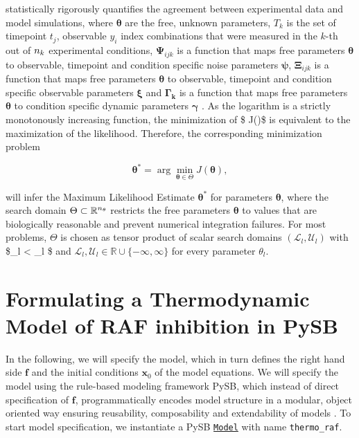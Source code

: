 \documentclass[11pt]{article}
\begin{document}
statistically rigorously quantifies the agreement between experimental
data and model simulations, where \(\boldsymbol{\theta}\) are the free,
unknown parameters, \(T_k\) is the set of timepoint \(t_j\), observable
\(y_i\) index combinations that were measured in the \(k\)-th out of
\({n_{k}}\) experimental conditions, \(\boldsymbol{\Psi}_{ijk}\) is a
function that maps free parameters \(\boldsymbol{\theta}\) to
observable, timepoint and condition specific noise parameters
\(\boldsymbol{\psi}\), \(\boldsymbol{\Xi}_{ijk}\) is a function that
maps free parameters \(\boldsymbol{\theta}\) to observable, timepoint
and condition specific observable parameters \(\boldsymbol{\xi}\) and
\(\boldsymbol{\Gamma_{k}}\) is a function that maps free parameters
\(\boldsymbol{\theta}\) to condition specific dynamic parameters
\(\boldsymbol{\gamma}\) . As the logarithm is a strictly monotonously
increasing function, the minimization of \$ J(\boldsymbol{\theta})\$ is
equivalent to the maximization of the likelihood. Therefore, the
corresponding minimization problem

\begin{equation}
\boldsymbol{\theta}^* = \arg \min_{\boldsymbol{\theta} \in \Theta} J(\boldsymbol{\theta}),
\label{eq:mle}
\end{equation}

will infer the Maximum Likelihood Estimate \(\boldsymbol{\theta}^*\) for
parameters \(\boldsymbol{\theta}\), where the search domain
\(\Theta\subset{\mathbb{R}}^{{n_{\theta}}}\) restricts the free
parameters \(\boldsymbol{\theta}\) to values that are biologically
reasonable and prevent numerical integration failures. For most
problems, \(\Theta\) is chosen as tensor product of scalar search
domains \((\mathcal{L}_l,\mathcal{U}_l)\) with \$\_l
\textless{} \_l \$ and
\(\mathcal{L}_l, \mathcal{U}_l \in \mathbb{R}\cup\{-\infty,\infty\}\)
for every parameter \(\theta_l\).

    \hypertarget{formulating-a-thermodynamic-model-of-raf-inhibition-in-pysb}{%
\section{Formulating a Thermodynamic Model of RAF inhibition in
PySB}\label{formulating-a-thermodynamic-model-of-raf-inhibition-in-pysb}}

    In the following, we will specify the model, which in turn defines the
right hand side \(\textbf{f}\) and the initial conditions
\(\textbf{x}_0\) of the model equations. We will specify the model using
the rule-based modeling framework PySB, which instead of direct
specification of \(\textbf{f}\), programmatically encodes model
structure in a modular, object oriented way ensuring reusability,
composability and extendability of models \cite{2754712/7D6BBY4A}. To
start model specification, we instantiate a PySB
\href{https://pysb.readthedocs.io/en/stable/modules/core.html\#pysb.core.Model}{\texttt{Model}}
with name \texttt{thermo\_raf}.
\end{document}
